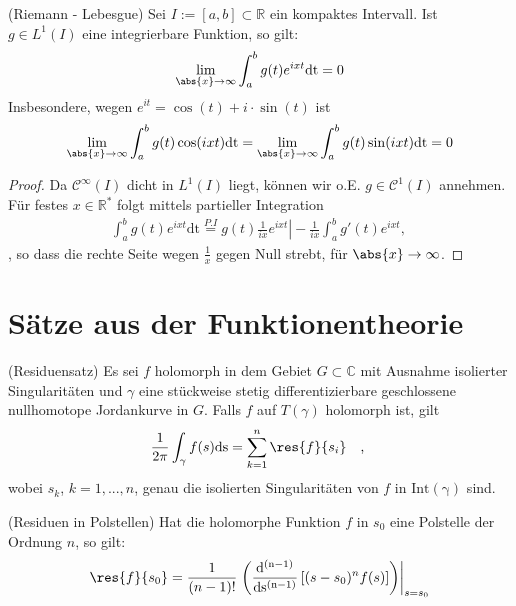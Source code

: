 \begin{satz}(Riemann - Lebesgue)\label{a:RLebesgue} Sei $I:=[a, b] \subset \mathbb{R}$ ein kompaktes Intervall. Ist $g \in L^1(I)$ eine integrierbare Funktion, so gilt:
\begin{align}
	\lim_{\abs{x}\rightarrow \infty}{\int_a^b g(t) e^{ixt} \mathrm{dt} = 0}
\end{align}
Insbesondere, wegen $e^{it} = \cos(t) + i\cdot\sin(t)$ ist
\begin{align}
	\lim_{\abs{x}\rightarrow \infty}{\int_a^b g(t) \cos(i x t) \mathrm{dt}} = \lim_{\abs{x}\rightarrow \infty}{\int_a^b g(t) \sin(i x t) \mathrm{dt}} = 0
\end{align}
\begin{proof}
Da $\mathscr{C}^{\infty}(I)$ dicht in $L^1(I)$ liegt, können wir o.E. $g \in \mathscr{C}^1(I)$ annehmen. Für festes $x \in \mathbb{R}^*$ folgt mittels partieller Integration
\begin{align}
	\int_a^b g(t) e^{ixt} \mathrm{dt}  \stackrel{P.I}{=} \left. g(t)\frac{1}{i x} e^{i x t} \right\vert - \frac{1}{i x}{\int_a^b g'(t) e^{i x t}}  \text{, }
\end{align},
so dass die rechte Seite wegen $\frac{1}{x}$ gegen Null strebt, für $\abs{x} \rightarrow \infty$.
\end{proof}
\end{satz}\cite[Seite 69]{Dambrowski2000}
\section{Sätze aus der Funktionentheorie}
\begin{satz}\label{a:res}(Residuensatz)
Es sei $f$ holomorph in dem Gebiet $G \subset \mathbb{C}$ mit Ausnahme isolierter Singularitäten und $\gamma$ eine stückweise stetig differentizierbare geschlossene nullhomotope Jordankurve in $G$. Falls $f$ auf $T(\gamma)$ holomorph ist, gilt
\begin{align}
	\frac{1}{2 \pi} \int_{\gamma} f(s) \mathrm{ds} = \sum_{k=1}^{n} \res{f}{s_i} \quad \text{, }
\end{align}
wobei $s_k$, $k=1,..., n$, genau die isolierten Singularitäten von $f$ in $\mathrm{Int(\gamma)}$ sind.
\end{satz} \cite[Seite 76]{Lauf2006}
\begin{satz}\label{a:respol}(Residuen in Polstellen)
Hat die holomorphe Funktion $f$ in $s_0$ eine Polstelle der Ordnung $n$, so gilt:
\begin{align}
	\res{f}{s_0} = \frac{1}{(n-1)!} \left. \left(\frac{\mathrm{d^{(n-1)}}}{\mathrm{ds^{(n-1)}}}\left[(s-s_0)^n f(s) \right] \right) \right|_{s = s_0}
\end{align}
\end{satz}\cite[Seite 77]{Lauf2006}
